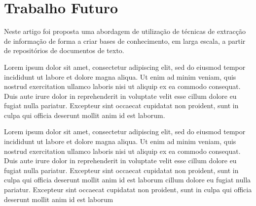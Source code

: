 \documentclass[a4paper, twocolumn, 11pt, twoside]{article}
\begin{document}
{\begin{comment}


\end{comment}

\section{Trabalho Futuro}
\label{sec:future_work}

Neste artigo foi proposta uma abordagem de utilização de técnicas de extracção de informação de forma a criar bases de conhecimento, em larga escala, a partir de repositórios de documentos de texto. 

Lorem ipsum dolor sit amet, consectetur adipiscing elit, sed do eiusmod tempor incididunt ut labore et dolore magna aliqua. Ut enim ad minim veniam, quis nostrud exercitation ullamco laboris nisi ut aliquip ex ea commodo consequat. Duis aute irure dolor in reprehenderit in voluptate velit esse cillum dolore eu fugiat nulla pariatur. Excepteur sint occaecat cupidatat non proident, sunt in culpa qui officia deserunt mollit anim id est laborum.

Lorem ipsum dolor sit amet, consectetur adipiscing elit, sed do eiusmod tempor incididunt ut labore et dolore magna aliqua. Ut enim ad minim veniam, quis nostrud exercitation ullamco laboris nisi ut aliquip ex ea commodo consequat. Duis aute irure dolor in reprehenderit in voluptate velit esse cillum dolore eu fugiat nulla pariatur. Excepteur sint occaecat cupidatat non proident, sunt in culpa qui officia deserunt mollit anim id est laborum cillum dolore eu fugiat nulla pariatur. Excepteur sint occaecat cupidatat non proident, sunt in culpa qui officia deserunt mollit anim id est laborum






}
\end{document}
